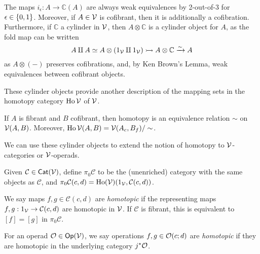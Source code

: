 \documentclass[a4paper,10pt
,draft
]{article}%
\renewcommand{\1}{\eta}%
\begin{document}

\begin{remark}
      \label{CYL_REM}
      The maps $i_\epsilon: A \to \mathbb C(A)$ are always weak equivalences by 2-out-of-3 for $\epsilon \in \left\{0,1\right\}$.
      Moreover, if $A \in \mathcal V$ is cofibrant, then it is additionally a cofibration.
      Furthermore, if $\mathbb C$ a cylinder in $\mathcal V$,
      then $A \otimes \mathbb C$ is a cylinder object for $A$,
      as the fold map can be written
      \begin{equation}
            A \amalg A \simeq A \otimes (1_{\mathcal V} \amalg 1_{\mathcal V}) \rightarrowtail A \otimes \mathbb C \xrightarrow{\sim} A
      \end{equation}
      as $A \otimes (-)$ preserves cofibrations, and, by Ken Brown's Lemma, weak equivalences between cofibrant objects.
\end{remark}

These cylinder objects provide another description of the mapping sets in the homotopy category $\operatorname{Ho} \mathcal V$ of $\mathcal V$.

\begin{proposition}       
      If $A$ is fibrant and $B$ cofibrant, then
      homotopy is an equivalence relation $\sim$ on $\mathcal V(A,B)$.
      Moreover, 
      $\operatorname{Ho} \mathcal V (A,B) = \mathcal V(A_c, B_f)/\sim$.
\end{proposition}

We can use these cylinder objects to extend the notion of homotopy to $\mathcal V$-categories or $\mathcal V$-operads.

\begin{definition}
      \label{HTPY_DEFN}
      Given $\mathcal C \in \mathsf{Cat}(\mathcal V)$, define $\pi_0 \mathcal C$ to be the (unenriched) category with
      the same objects as $\mathcal C$, and $\pi_0 \mathcal C (c,d) = \operatorname{Ho}(\mathcal V)(1_{\mathcal V}, \mathcal C(c,d))$.

      We say maps $f,g \in \mathcal C(c,d)$ are \textit{homotopic}
      if the representing maps $f,g: 1_{\mathcal V} \to \mathcal C(c,d)$ are homotopic in $\mathcal V$.
      If $\mathcal C$ is fibrant, this is equivalent to $[f] = [g]$ in $\pi_0\mathcal C$.

      For an operad $\mathcal{O} \in \mathsf{Op}(\mathcal V)$, we say operations $f,g \in \mathcal{O}(c;d)$ are \textit{homotopic} if they are homotopic in the underlying category $j^{\**}\O$. 
\end{definition}
\end{document}
